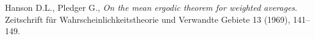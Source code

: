 \documentclass[12pt,a4paper]{article}
\begin{document}
\begin{thebibliography}{99.}

Hanson D.L., Pledger G.,
\emph{On the mean ergodic theorem for weighted averages}. 
Zeitschrift für Wahrscheinlichkeitstheorie und Verwandte Gebiete 13 (1969), 141--149.

\end{thebibliography}
\end{document}
